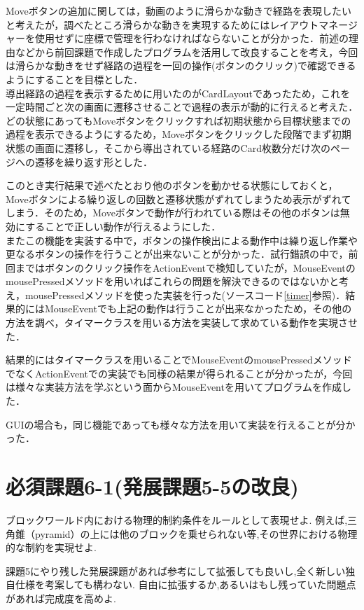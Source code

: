 \documentclass[12pt]{jarticle}
\begin{document}
\vspace{10mm}

Moveボタンの追加に関しては，動画のように滑らかな動きで経路を表現したいと考えたが，調べたところ滑らかな動きを実現するためにはレイアウトマネージャーを使用せずに座標で管理を行わなければならないことが分かった．前述の理由などから前回課題で作成したプログラムを活用して改良することを考え，今回は滑らかな動きをせず経路の過程を一回の操作(ボタンのクリック)で確認できるようにすることを目標とした．\\

導出経路の過程を表示するために用いたのがCardLayoutであったため，これを一定時間ごと次の画面に遷移させることで過程の表示が動的に行えると考えた．どの状態にあってもMoveボタンをクリックすれば初期状態から目標状態までの過程を表示できるようにするため，Moveボタンをクリックした段階でまず初期状態の画面に遷移し，そこから導出されている経路のCard枚数分だけ次のページへの遷移を繰り返す形とした．\par
このとき実行結果で述べたとおり他のボタンを動かせる状態にしておくと，Moveボタンによる繰り返しの回数と遷移状態がずれてしまうため表示がずれてしまう．そのため，Moveボタンで動作が行われている際はその他のボタンは無効にすることで正しい動作が行えるようにした．\\


またこの機能を実装する中で，ボタンの操作検出による動作中は繰り返し作業や更なるボタンの操作を行うことが出来ないことが分かった．試行錯誤の中で，前回まではボタンのクリック操作をActionEventで検知していたが，MouseEventのmousePressedメソッドを用いればこれらの問題を解決できるのではないかと考え，mousePressedメソッドを使った実装を行った(ソースコード\ref{timer}参照)．結果的にはMouseEventでも上記の動作は行うことが出来なかったため，その他の方法を調べ，タイマークラスを用いる方法を実装して求めている動作を実現させた．\par
結果的にはタイマークラスを用いることでMouseEventのmousePressedメソッドでなくActionEventでの実装でも同様の結果が得られることが分かったが，今回は様々な実装方法を学ぶという面からMouseEventを用いてプログラムを作成した．\par
GUIの場合も，同じ機能であっても様々な方法を用いて実装を行えることが分かった．



\section{必須課題6-1(発展課題5-5の改良)}
\begin{screen}
ブロックワールド内における物理的制約条件をルールとして表現せよ.
例えば,三角錐（pyramid）の上には他のブロックを乗せられない等,その世界における物理的な制約を実現せよ.
\end{screen}
\begin{screen}
    課題5にやり残した発展課題があれば参考にして拡張しても良いし,全く新しい独自仕様を考案しても構わない.
    自由に拡張するか,あるいはもし残っていた問題点があれば完成度を高めよ.
\end{screen}
\end{document}
